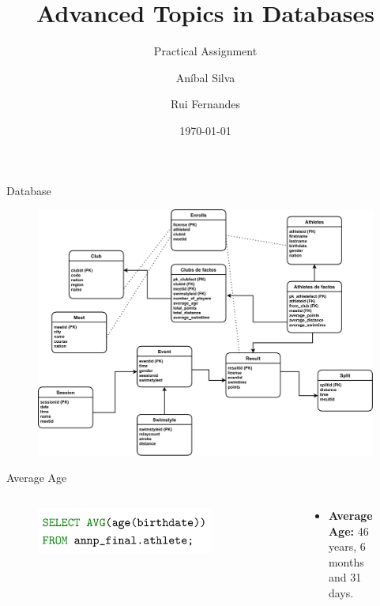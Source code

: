 \documentclass[aspectratio=169, xcolor=dvipsnames]{beamer}
\title[short title]{Advanced Topics in Databases}
\subtitle{Practical Assignment}
\author{Aníbal Silva \and Rui Fernandes}
\date{\today}\usepackage[cache=false]{minted}
\begin{document}
\renewcommand{\today}{\ifcase \month\or January\or February\or March\or %
April\or May\or June\or July\or August\or September\or October\or November\or %
December\fi, \number \year}

\begin{frame}
    \titlepage
\end{frame}

\begin{frame}{Database}
    \begin{figure}[H]
        \centering
        \includegraphics[width=.65\textwidth]{img/datawarehouse.pdf}
    \end{figure}
\end{frame}

\begin{frame}{Average Age}
\begin{columns}[c]
\begin{column}{.5\textwidth}
\begin{figure}
    \centering
    \includegraphics[width=0.9\textwidth]{img/sql/avgage.png}
\end{figure}
\end{column}

\begin{column}{.5\textwidth}
\begin{figure}
    \begin{itemize}
        \item \textbf{Average Age:} 46 years, 6 months and 31 days.
    \end{itemize}
\end{figure}
\end{column}
\end{columns}
\end{frame}
\end{document}
